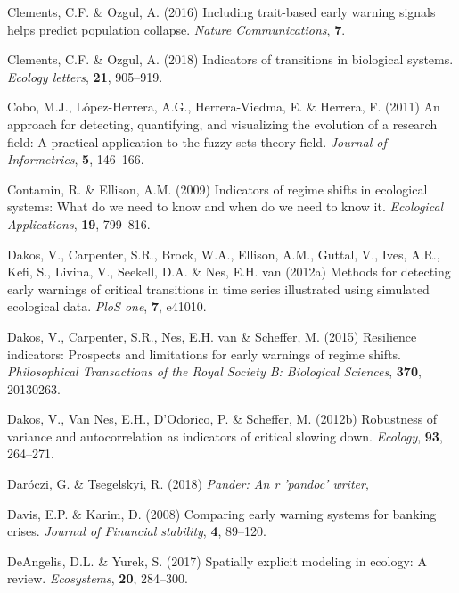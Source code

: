 \documentclass[12pt,twoside,openany]{reedthesis}
\begin{document}
\leavevmode\hypertarget{ref-clements_including_2016}{}%
Clements, C.F. \& Ozgul, A. (2016) Including trait-based early warning signals helps predict population collapse. \emph{Nature Communications}, \textbf{7}.

\leavevmode\hypertarget{ref-clements2018indicators}{}%
Clements, C.F. \& Ozgul, A. (2018) Indicators of transitions in biological systems. \emph{Ecology letters}, \textbf{21}, 905--919.

\leavevmode\hypertarget{ref-cobo2011approach}{}%
Cobo, M.J., López-Herrera, A.G., Herrera-Viedma, E. \& Herrera, F. (2011) An approach for detecting, quantifying, and visualizing the evolution of a research field: A practical application to the fuzzy sets theory field. \emph{Journal of Informetrics}, \textbf{5}, 146--166.

\leavevmode\hypertarget{ref-contamin_indicators_2009}{}%
Contamin, R. \& Ellison, A.M. (2009) Indicators of regime shifts in ecological systems: What do we need to know and when do we need to know it. \emph{Ecological Applications}, \textbf{19}, 799--816.

\leavevmode\hypertarget{ref-dakos2012methods}{}%
Dakos, V., Carpenter, S.R., Brock, W.A., Ellison, A.M., Guttal, V., Ives, A.R., Kefi, S., Livina, V., Seekell, D.A. \& Nes, E.H. van (2012a) Methods for detecting early warnings of critical transitions in time series illustrated using simulated ecological data. \emph{PloS one}, \textbf{7}, e41010.

\leavevmode\hypertarget{ref-dakos2015resilience}{}%
Dakos, V., Carpenter, S.R., Nes, E.H. van \& Scheffer, M. (2015) Resilience indicators: Prospects and limitations for early warnings of regime shifts. \emph{Philosophical Transactions of the Royal Society B: Biological Sciences}, \textbf{370}, 20130263.

\leavevmode\hypertarget{ref-dakos2012robustness}{}%
Dakos, V., Van Nes, E.H., D'Odorico, P. \& Scheffer, M. (2012b) Robustness of variance and autocorrelation as indicators of critical slowing down. \emph{Ecology}, \textbf{93}, 264--271.

\leavevmode\hypertarget{ref-pander}{}%
Daróczi, G. \& Tsegelskyi, R. (2018) \emph{Pander: An r 'pandoc' writer},

\leavevmode\hypertarget{ref-davis_comparing_2008}{}%
Davis, E.P. \& Karim, D. (2008) Comparing early warning systems for banking crises. \emph{Journal of Financial stability}, \textbf{4}, 89--120.

\leavevmode\hypertarget{ref-deangelis2017spatially}{}%
DeAngelis, D.L. \& Yurek, S. (2017) Spatially explicit modeling in ecology: A review. \emph{Ecosystems}, \textbf{20}, 284--300.
\end{document}
